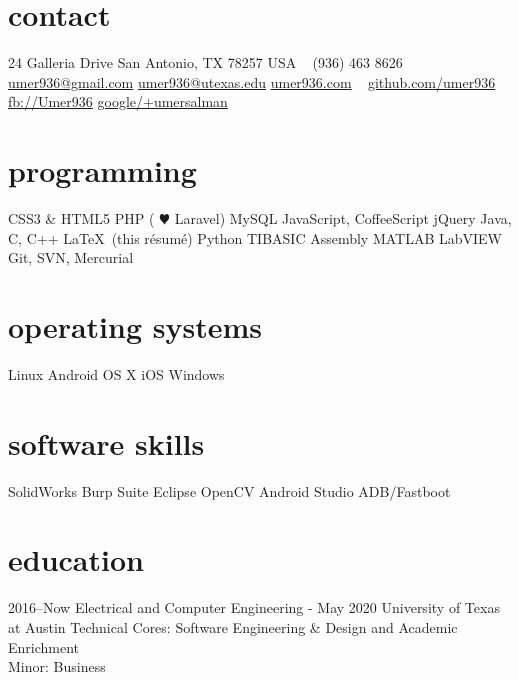 \documentclass[]{friggeri-cv} %
\begin{document}


\begin{aside} %
	\section{contact}
	24 Galleria Drive
	San Antonio, TX 78257
	USA
	~
	(936) 463 8626
	~
	\href{mailto:umer936@gmail.com}{umer936@gmail.com}
	\href{mailto:umer936@utexas.edu}{umer936@utexas.edu}
	\href{http://umer936.com}{umer936.com}
	~
	\href{http://github.com/umer936}{github.com/umer936}
	\href{http://facebook.com/Umer936}{fb://Umer936}
	\href{http://google.com/+umersalman}{google/+umersalman}
	~
	\section{programming}
	CSS3 \& HTML5
	PHP ({\color{red} $\varheartsuit$} Laravel)
	MySQL
	JavaScript, CoffeeScript
	jQuery
	Java, C, C++
	\LaTeX \ (this r\'esum\'e)
	Python
	TIBASIC
	Assembly
	MATLAB
	LabVIEW
	Git, SVN, Mercurial
	~
	\section{operating systems}
	Linux
	Android
	OS X
	iOS
	Windows
	~
	\section{software skills}
	SolidWorks
	Burp Suite
	Eclipse
	OpenCV
	Android Studio
	ADB/Fastboot
\end{aside}


\section{education}
\vspace{-7pt}

\begin{entrylist}

	\entry
	{2016--Now}
	{Electrical and Computer Engineering - May 2020}
	{University of Texas at Austin}
	{
		Technical Cores: Software Engineering \& Design and Academic Enrichment \\
		Minor: Business
	}

\end{entrylist}
\end{document}
